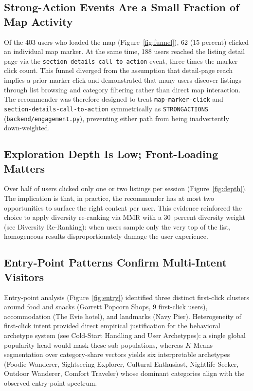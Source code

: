 \documentclass[12pt,letterpaper]{article}
\newcommand{\codeunderscore}{\discretionary{\textunderscore}{}{\textunderscore}}
\newcommand{\code}[1]{\begingroup\let\_\codeunderscore\texttt{\small #1}\endgroup}
\begin{document}
\subsection{Strong-Action Events Are a Small Fraction of Map Activity}

Of the 403 users who loaded the map (Figure~\ref{fig:funnel}), 62
(15 percent) clicked an individual map marker. At the same time, 188
users reached the listing detail page via the
\code{section-details-call-to-action} event, three times the
marker-click count. This funnel diverged from the assumption that
detail-page reach implies a prior marker click and demonstrated that
many users discover listings through list browsing and category
filtering rather than direct map interaction. The recommender was
therefore designed to treat \code{map-marker-click} and
\code{section-details-call-to-action} symmetrically as
\code{STRONG\_ACTIONS} (\code{backend/engagement.py}), preventing
either path from being inadvertently down-weighted.

\subsection{Exploration Depth Is Low; Front-Loading Matters}

Over half of users clicked only one or two listings per session
(Figure~\ref{fig:depth}). The implication is that, in practice, the
recommender has at most two opportunities to surface the right
content per user. This evidence reinforced the choice to apply
diversity re-ranking via MMR with a 30~percent diversity weight
(see Diversity Re-Ranking): when users sample only the very top of the list,
homogeneous results disproportionately damage the user experience.

\subsection{Entry-Point Patterns Confirm Multi-Intent Visitors}

Entry-point analysis (Figure~\ref{fig:entry}) identified three
distinct first-click clusters around food and snacks (Garrett Popcorn
Shops, 9 first-click users), accommodation (The Evie hotel), and
landmarks (Navy Pier). Heterogeneity of first-click intent provided
direct empirical justification for the behavioral archetype system
(see Cold-Start Handling and User Archetypes): a single global popularity head would mask these
sub-populations, whereas $K$-Means segmentation over category-share
vectors yields six interpretable archetypes (Foodie Wanderer,
Sightseeing Explorer, Cultural Enthusiast, Nightlife Seeker, Outdoor
Wanderer, Comfort Traveler) whose dominant categories align with the
observed entry-point spectrum.
\end{document}

